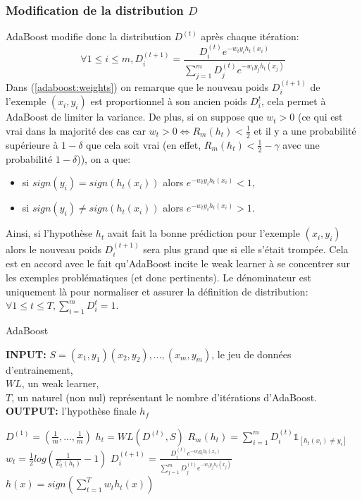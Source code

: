\documentclass[12pt]{article}
\begin{document}
	\subsubsection{Modification de la distribution $D$}
	\label{adaboost:newdistrib}
	AdaBoost modifie donc la distribution $D^{(t)}$ après chaque itération: 
	\begin{equation}
		\label{adaboost:weights}
		\forall 1 \leq i \leq m, D^{(t+1)}_i = \frac{D^{(t)}_i e^{-w_t y_i h_t(x_i)}}{\sum_{j=1}^m D^{(t)}_j e^{-w_t y_j h_t(x_j)}} 
	\end{equation}   
	Dans (\ref{adaboost:weights}) on remarque que le nouveau poids $D^{(t+1)}_i$ de l'exemple $(x_i,y_i)$ est proportionnel à son ancien poids $D^{t}_i$, cela permet à AdaBoost de limiter la variance. De plus, si on suppose que $w_t > 0$ (ce qui est vrai dans la majorité des cas car $w_t > 0 \Leftrightarrow R_m(h_t) < \frac{1}{2}$ et il y a une probabilité supérieure à $1-\delta$ que cela soit vrai (en effet, $R_m(h_t) < \frac{1}{2} - \gamma$ avec une probabilité $1-\delta$)), on a que:
	\begin{itemize}
		\item si $sign(y_i)=sign(h_t(x_i))$ alors $e^{-w_t y_i h_t(x_i)} < 1$,
		\item si $sign(y_i) \neq sign(h_t(x_i))$ alors $e^{-w_t y_i h_t(x_i)} > 1$. 
	\end{itemize}
	Ainsi, si l'hypothèse $h_t$ avait fait la bonne prédiction pour l'exemple $(x_i,y_i)$ alors le nouveau poids $D^{(t+1)}_i$ sera plus grand que si elle s'était trompée. Cela est en accord avec le fait qu'AdaBoost incite le weak learner à se concentrer sur les exemples problématiques (et donc pertinents).
	Le dénominateur est uniquement là pour normaliser et assurer la définition de distribution: $\forall 1 \leq t \leq T, \sum_{i=1}^m D^t_i = 1$.
	
	
	\begin{algorithm}[H]
		\caption{AdaBoost}
		\label{adaboost:algo}
		\begin{flushleft}
			\textbf{INPUT:} $S=(x_1,y_1)(x_2,y_2),...,(x_m,y_m)$, le jeu de données d'entrainement,\\
			\hspace{1.5cm} $WL$, un weak learner,\\
			\hspace{1.5cm} $T$, un naturel (non nul) représentant le nombre d'itérations d'AdaBoost.\\
			\textbf{OUTPUT:} l'hypothèse finale $h_f$
		\end{flushleft}
		\begin{algorithmic}[1]
			\State $D^{(1)}=(\frac{1}{m},...,\frac{1}{m})$
			\State $h_t = WL(D^{(t)},S)$
			\State $R_m(h_t)= \sum_{i=1}^m D^{(t)}_i \mathbb{1}_{[h_t(x_i) \neq y_i]}$
			\State $w_t = \frac{1}{2} log(\frac{1}{E_t(h_t)} - 1)$
			\State $D^{(t+1)}_i = \frac{D^{(t)}_i e^{-w_t y_i h_t(x_i)}}{\sum_{j=1}^m D^{(t)}_j e^{-w_t y_j h_t(x_j)}}$ 
			\EndFor
			\EndFor
			\State $h(x) = sign (\sum_{t=1}^T w_t h_t(x))$
			\State {}
			\EndFunction
		\end{algorithmic}
	\end{algorithm}
	
\end{document}
